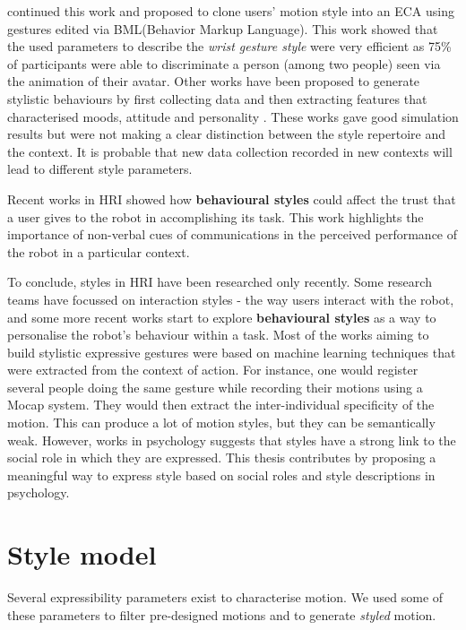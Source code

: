 \documentclass[smallextended]{svjour3}
\begin{document}
\cite{Rajagopal2012} continued this work and proposed to clone users' motion style into an ECA using gestures edited via BML(Behavior Markup Language).
This work showed that the used parameters to describe the \textit{wrist gesture style} were very efficient as 75\% of participants were able to discriminate a person (among two people) seen via the animation of their avatar.
Other works have been proposed to generate stylistic behaviours by first collecting data and then extracting features that characterised moods, attitude and personality \cite{Kang2013a,Czy2009}. 
These works gave good simulation results but were not making a clear distinction between the style repertoire and the context. 
It is probable that new data collection recorded in new contexts will lead to different style parameters.

Recent works in HRI showed how \textbf{behavioural styles} \cite{Ligthart2013,VandenBrule2014} could affect the trust that a user gives to the robot in accomplishing its task. 
This work highlights the importance of non-verbal cues of communications in the perceived performance of the robot in a particular context. 


To conclude, styles in HRI have been researched only recently. 
Some research teams have focussed on interaction styles - the way users interact with the robot, and some more recent works start to explore \textbf{behavioural styles} as a way to personalise the robot's behaviour within a task. 
Most of the works aiming to build stylistic expressive gestures were based on machine learning techniques that were extracted from the context of action. 
For instance, one would register several people doing the same gesture while recording their motions using a Mocap system.
They would then extract the inter-individual specificity of the motion.
This can produce a lot of motion styles, but they can be semantically weak.
However, works in psychology suggests that styles have a strong link to the social role in which they are expressed. 
This thesis contributes by proposing a meaningful way to express style based on social roles and style descriptions in psychology.

\section{Style model}
Several expressibility parameters exist to characterise motion. 
We used some of these parameters to filter pre-designed motions and to generate \textit{styled} motion.
\end{document}
